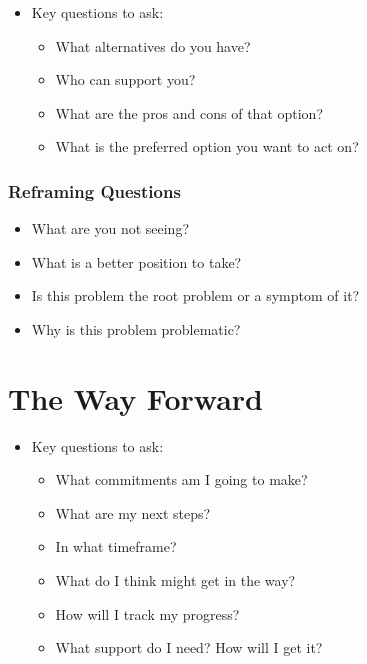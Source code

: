 \documentclass[
]{book}
\providecommand{\tightlist}{%
  \setlength{\itemsep}{0pt}\setlength{\parskip}{0pt}}
\begin{document}
\begin{itemize}
\tightlist
\item
  Key questions to ask:

  \begin{itemize}
  \tightlist
  \item
    What alternatives do you have?
  \item
    Who can support you?
  \item
    What are the pros and cons of that option?
  \item
    What is the preferred option you want to act on?
  \end{itemize}
\end{itemize}

\hypertarget{reframing-questions}{%
\subsubsection*{Reframing Questions}\label{reframing-questions}}

\begin{itemize}
\tightlist
\item
  What are you not seeing?
\item
  What is a better position to take?
\item
  Is this problem the root problem or a symptom of it?
\item
  Why is this problem problematic?
\end{itemize}

\hypertarget{the-way-forward}{%
\section*{The Way Forward}\label{the-way-forward}}

\begin{itemize}
\tightlist
\item
  Key questions to ask:

  \begin{itemize}
  \tightlist
  \item
    What commitments am I going to make?
  \item
    What are my next steps?
  \item
    In what timeframe?
  \item
    What do I think might get in the way?
  \item
    How will I track my progress?
  \item
    What support do I need? How will I get it?
  \end{itemize}
\end{itemize}
\end{document}
